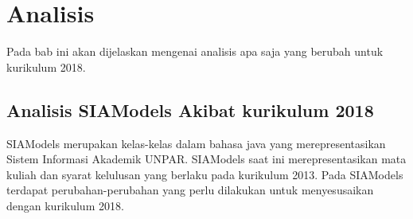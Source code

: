 \chapter{Analisis}
\label{chap:analisis}

Pada bab ini akan dijelaskan mengenai analisis apa saja yang berubah untuk kurikulum 2018.

\section{Analisis SIAModels Akibat kurikulum 2018}
\label{subbab:analisissiamodels}

SIAModels merupakan kelas-kelas dalam bahasa java yang merepresentasikan Sistem Informasi Akademik UNPAR. SIAModels saat ini merepresentasikan mata kuliah dan syarat kelulusan yang berlaku pada kurikulum 2013. Pada SIAModels terdapat perubahan-perubahan yang perlu dilakukan untuk menyesusaikan dengan kurikulum 2018.

